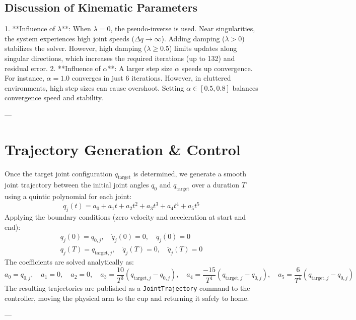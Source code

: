 \documentclass[12pt, a4paper]{article}
\begin{document}
\subsection{Discussion of Kinematic Parameters}
1. **Influence of $\lambda$**: When $\lambda = 0$, the pseudo-inverse is used. Near singularities, the system experiences high joint speeds ($\Delta q \to \infty$). Adding damping ($\lambda > 0$) stabilizes the solver. However, high damping ($\lambda \ge 0.5$) limits updates along singular directions, which increases the required iterations (up to 132) and residual error.
2. **Influence of $\alpha$**: A larger step size $\alpha$ speeds up convergence. For instance, $\alpha = 1.0$ converges in just 6 iterations. However, in cluttered environments, high step sizes can cause overshoot. Setting $\alpha \in [0.5, 0.8]$ balances convergence speed and stability.

---

\section{Trajectory Generation \& Control}
Once the target joint configuration $q_{\text{target}}$ is determined, we generate a smooth joint trajectory between the initial joint angles $q_0$ and $q_{\text{target}}$ over a duration $T$ using a quintic polynomial for each joint:
$$q_j(t) = a_0 + a_1 t + a_2 t^2 + a_3 t^3 + a_4 t^4 + a_5 t^5$$
Applying the boundary conditions (zero velocity and acceleration at start and end):
\begin{align*}
q_j(0) = q_{0,j}, \quad \dot{q}_j(0) = 0, \quad \ddot{q}_j(0) = 0 \\
q_j(T) = q_{\text{target},j}, \quad \dot{q}_j(T) = 0, \quad \ddot{q}_j(T) = 0
\end{align*}
The coefficients are solved analytically as:
$$a_0 = q_{0,j}, \quad a_1 = 0, \quad a_2 = 0, \quad a_3 = \frac{10}{T^3}(q_{\text{target},j} - q_{0,j}), \quad a_4 = \frac{-15}{T^4}(q_{\text{target},j} - q_{0,j}), \quad a_5 = \frac{6}{T^5}(q_{\text{target},j} - q_{0,j})$$
The resulting trajectories are published as a \texttt{JointTrajectory} command to the controller, moving the physical arm to the cup and returning it safely to home.

---

\end{document}
